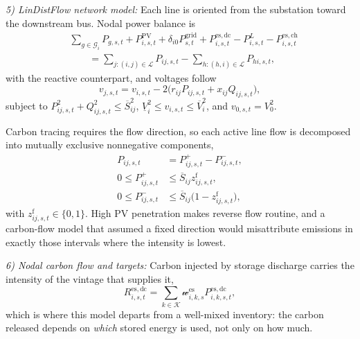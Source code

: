 \documentclass[journal]{IEEEtran}
\begin{document}
\emph{5) LinDistFlow network model:}
Each line is oriented from the substation toward the downstream bus.
Nodal power balance is
\begin{align}
&\sum_{g\in\mathcal{G}_i}P_{g,s,t}
+P_{i,s,t}^{\mathrm{PV}}
+\delta_{i0}P_{s,t}^{\mathrm{grid}}
+P_{i,s,t}^{\mathrm{es,dc}}
-P_{i,s,t}^{L}
-P_{i,s,t}^{\mathrm{es,ch}}
\nonumber\\
&\qquad=
\sum_{j:(i,j)\in\mathcal{L}}P_{ij,s,t}
-\sum_{h:(h,i)\in\mathcal{L}}P_{hi,s,t},
\label{eq:nodal_active_balance}
\end{align}
with the reactive counterpart, and voltages follow
\cite{Baran1989DistFlow}
\begin{equation}
v_{j,s,t}=v_{i,s,t}-2\bigl(r_{ij}P_{ij,s,t}+x_{ij}Q_{ij,s,t}\bigr),
\label{eq:lindistflow_voltage}
\end{equation}
subject to
$P_{ij,s,t}^{2}+Q_{ij,s,t}^{2}\leq\overline{S}_{ij}^{2}$,
$\underline{V}_i^2\leq v_{i,s,t}\leq\overline{V}_i^2$, and
$v_{0,s,t}=V_0^2$.

Carbon tracing requires the flow direction, so each active line flow is
decomposed into mutually exclusive nonnegative components,
\begin{align}
P_{ij,s,t}&=P_{ij,s,t}^{+}-P_{ij,s,t}^{-},
\label{eq:flow_decomposition}\\
0\leq P_{ij,s,t}^{+}&\leq\overline{S}_{ij}z_{ij,s,t}^{\mathrm{f}},
\label{eq:forward_flow}\\
0\leq P_{ij,s,t}^{-}&\leq\overline{S}_{ij}
\bigl(1-z_{ij,s,t}^{\mathrm{f}}\bigr),
\label{eq:reverse_flow}
\end{align}
with $z_{ij,s,t}^{\mathrm{f}}\in\{0,1\}$. High PV penetration makes
reverse flow routine, and a carbon-flow model that assumed a fixed
direction would misattribute emissions in exactly those intervals where
the intensity is lowest.

\emph{6) Nodal carbon flow and targets:}
Carbon injected by storage discharge carries the intensity of the vintage
that supplies it,
\begin{equation}
R_{i,s,t}^{\mathrm{es,dc}}
=\sum_{k\in\mathcal{K}}
\mathscr{w}_{i,k,s}^{\mathrm{es}}P_{i,k,s,t}^{\mathrm{es,dc}},
\label{eq:storage_carbon_flow}
\end{equation}
which is where this model departs from a well-mixed inventory: the carbon
released depends on \emph{which} stored energy is used, not only on how
much.
\end{document}
